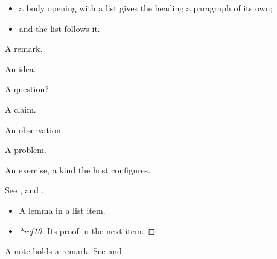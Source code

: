 \begin{definition}\flmLabels{\label{ref7}}
\begin{itemize}
\item a body opening with a list gives the heading a paragraph of its own;
\item and the list follows it.
\end{itemize}
\end{definition}

\begin{remark}\flmLabels{\label{ref8}}
A remark.
\end{remark}

\begin{idea}
An idea.
\end{idea}

\begin{question}
A question?
\end{question}

\begin{claim}
A claim.
\end{claim}

\begin{observation}
An observation.
\end{observation}

\begin{problem}
A problem.
\end{problem}

\begin{exercise}\flmLabels{\label{ref9}}
An exercise, a kind the host configures.
\end{exercise}

See ,  and .

\begin{itemize}
\item\begin{lemma}\flmLabels{\label{ref10}}
A lemma in a list item.
\end{lemma}
\item\begin{proof}[*ref10]
Its proof in the next item.
\end{proof}
\end{itemize}

A note holds a remark. See  and .

